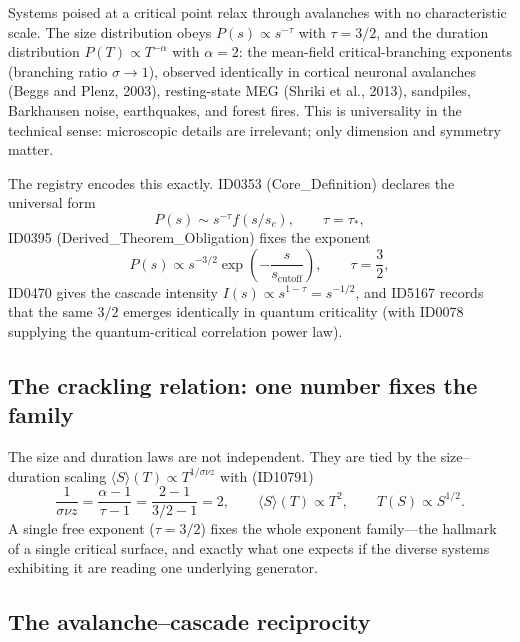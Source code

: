 \documentclass[11pt]{article}
\theoremstyle{remark}
\begin{document}
Systems poised at a critical point relax through avalanches with no characteristic scale. The size distribution obeys $P(s) \propto s^{-\tau}$ with $\tau = 3/2$, and the duration distribution $P(T) \propto T^{-\alpha}$ with $\alpha = 2$: the mean-field critical-branching exponents (branching ratio $\sigma \to 1$), observed identically in cortical neuronal avalanches (Beggs and Plenz, 2003), resting-state MEG (Shriki et al., 2013), sandpiles, Barkhausen noise, earthquakes, and forest fires. This is universality in the technical sense: microscopic details are irrelevant; only dimension and symmetry matter.

The registry encodes this exactly. ID0353 (Core\_Definition) declares the universal form
\begin{equation}
P(s) \sim s^{-\tau} f(s/s_c), \qquad \tau = \tau_\ast,
\end{equation}
ID0395 (Derived\_Theorem\_Obligation) fixes the exponent
\begin{equation}
P(s) \propto s^{-3/2} \exp\!\left( -\frac{s}{s_{\mathrm{cutoff}}} \right), \qquad \tau = \frac{3}{2},
\end{equation}
ID0470 gives the cascade intensity $I(s) \propto s^{1-\tau} = s^{-1/2}$, and ID5167 records that the same $3/2$ emerges identically in quantum criticality (with ID0078 supplying the quantum-critical correlation power law).

\subsection{The crackling relation: one number fixes the family}

The size and duration laws are not independent. They are tied by the size--duration scaling $\langle S \rangle(T) \propto T^{1/\sigma\nu z}$ with (ID10791)
\begin{equation}
\frac{1}{\sigma\nu z} = \frac{\alpha - 1}{\tau - 1} = \frac{2 - 1}{3/2 - 1} = 2,
\qquad \langle S\rangle(T) \propto T^2, \qquad T(S) \propto S^{1/2}.
\end{equation}
A single free exponent ($\tau = 3/2$) fixes the whole exponent family---the hallmark of a single critical surface, and exactly what one expects if the diverse systems exhibiting it are reading one underlying generator.

\subsection{The avalanche--cascade reciprocity}
\end{document}
